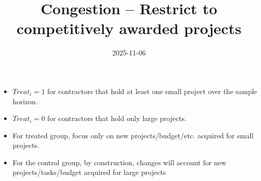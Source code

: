 \documentclass[
]{article}
\title{Congestion -- Restrict to competitively awarded projects}
\author{}
\date{\vspace{-2.5em}2025-11-06}
\providecommand{\tightlist}{%
  \setlength{\itemsep}{0pt}\setlength{\parskip}{0pt}}
\begin{document}
\maketitle

\begin{itemize}
\tightlist
\item
  \(Treat_i=1\) for contractors that hold at least one small project
  over the sample horizon.
\item
  \(Treat_i=0\) for contractors that hold only large projects.
\item
  For treated group, focus only on new projects/budget/etc. acquired for
  small projects.
\item
  For the control group, by construction, changes will account for new
  projects/tasks/budget acquired for large projects
\end{itemize}
\end{document}
